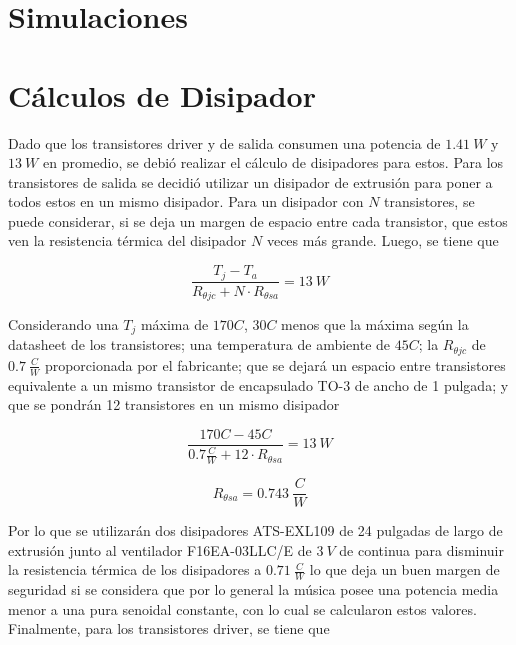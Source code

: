 \section{Simulaciones}
	\label{simulaciones}
	
	
\section{Cálculos de Disipador}
	Dado que los transistores driver y de salida consumen una potencia de $1.41 \ W$ y $13 \ W$ en promedio, se debió realizar el cálculo de disipadores para estos. Para los transistores de salida se decidió utilizar un disipador de extrusión para poner a todos estos en un mismo disipador. Para un disipador con $N$ transistores, se puede considerar, si se deja un margen de espacio entre cada transistor, que estos ven la resistencia térmica del disipador $N$ veces más grande. Luego, se tiene que
	
	\begin{equation}
	\frac{T_j - T_a}{R_{\theta jc} + N \cdot R_{\theta sa}} = 13 \ W
	\end{equation}
	
Considerando una $T_j$ máxima de $170  C$, $30 C$ menos que la máxima según la datasheet de los transistores; una temperatura de ambiente de $45 C$; la $R_{\theta jc}$ de $0.7 \ \frac{ C}{W}$ proporcionada por el fabricante; que se dejará un espacio entre transistores equivalente a un mismo transistor de encapsulado TO-3 de ancho de 1 pulgada; y que se pondrán 12 transistores en un mismo disipador
	
	\begin{equation}
	\frac{170  C - 45  C}{0.7 \frac{ C}{W} + 12 \cdot R_{\theta sa}} = 13 \ W
	\end{equation}	
	
	\begin{equation}
	R_{\theta sa} = 0.743 \ \frac{ C}{W}
	\end{equation}
	
Por lo que se utilizarán dos disipadores ATS-EXL109 de 24 pulgadas de largo de extrusión junto al ventilador F16EA-03LLC/E de $3 \ V$ de continua para disminuir la resistencia térmica de los disipadores a $0.71 \ \frac{ C}{W}$ lo que deja un buen margen de seguridad si se considera que por lo general la música posee una potencia media menor a una pura senoidal constante, con lo cual se calcularon estos valores.
Finalmente, para los transistores driver, se tiene que

